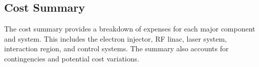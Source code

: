 \documentclass[10pt]{article}
\begin{document}
  \subsection{Cost Summary}
  
  The cost summary provides a breakdown of expenses for each major component and system. This includes the electron injector, RF linac, laser system, interaction region, and control systems. The summary also accounts for contingencies and potential cost variations.



%
%
%
%
\end{document}

